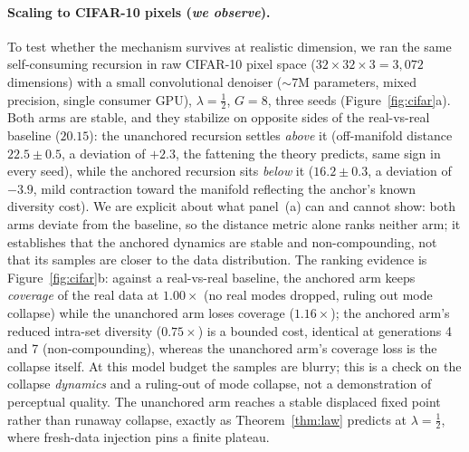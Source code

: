 \documentclass[11pt]{article}
\theoremstyle{remark}
\begin{document}
\paragraph{Scaling to CIFAR-10 pixels (\emph{we observe}).} To test whether the mechanism
survives at realistic dimension, we ran the same self-consuming recursion in raw CIFAR-10
pixel space ($32\times32\times3=3{,}072$ dimensions) with a small convolutional denoiser
($\sim$7M parameters, mixed precision, single consumer GPU), $\lambda=\tfrac12$, $G=8$,
three seeds (Figure~\ref{fig:cifar}a). Both arms are stable, and they stabilize on
opposite sides of the real-vs-real baseline ($20.15$): the unanchored recursion settles
\emph{above} it (off-manifold distance $22.5\pm0.5$, a deviation of $+2.3$, the
fattening the theory predicts, same sign in every seed), while the anchored recursion
sits \emph{below} it ($16.2\pm0.3$, a deviation of $-3.9$, mild contraction toward the
manifold reflecting the anchor's known diversity cost). We are explicit about what
panel~(a) can and cannot show: both arms deviate from the baseline, so the
distance metric alone ranks neither arm; it establishes that the anchored dynamics are
stable and non-compounding, not that its samples are closer to the data distribution.
The ranking evidence is Figure~\ref{fig:cifar}b: against a real-vs-real baseline, the
anchored arm keeps \emph{coverage} of the real data at $1.00\times$ (no real modes
dropped, ruling out mode collapse) while the unanchored arm loses coverage
($1.16\times$); the anchored arm's reduced intra-set diversity ($0.75\times$) is a
bounded cost, identical at generations 4 and 7 (non-compounding), whereas the unanchored
arm's coverage loss is the collapse itself. At this model budget the samples are blurry;
this is a check on the collapse \emph{dynamics} and a ruling-out of mode collapse, not a
demonstration of perceptual quality. The unanchored arm reaches a stable displaced fixed
point rather than runaway collapse, exactly as Theorem~\ref{thm:law} predicts at
$\lambda=\tfrac12$, where fresh-data injection pins a finite plateau.
\end{document}
